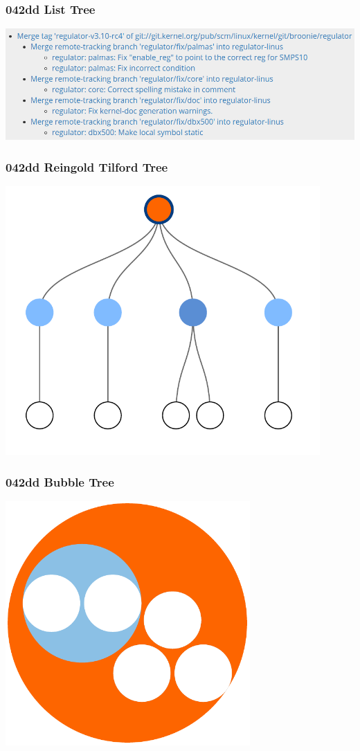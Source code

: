 \documentclass[15pt]{beamer}
\begin{document}
\begin{frame}
  \frametitle{042dd List Tree}
  \begin{center}
    \includegraphics[width=\textwidth]{figures/042d/list_tree.png}
  \end{center}
\end{frame}

\begin{frame}
  \frametitle{042dd Reingold Tilford Tree}
  \begin{center}
    \includegraphics[width=0.9\textwidth]{figures/042d/reingold_tree.pdf}
  \end{center}
\end{frame}

\begin{frame}
  \frametitle{042dd Bubble Tree}
  \begin{center}
    \includegraphics[width=0.7\textwidth]{figures/042d/bubble_tree.pdf}
  \end{center}
\end{frame}
\end{document}
